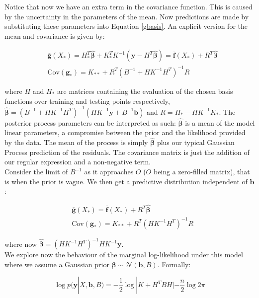 \documentclass[10pt,a4paper,twoside]{book}
\begin{document}
Notice that now we have an extra term in the covariance function. This is caused by the uncertainty in the parameters of the mean. Now predictions are made by substituting these parameters into Equation \ref{gbasis}. An explicit version for the mean and covariance is given by:

\begin{align}
&\overline{\boldsymbol{g}}(X_*) = H^T_* \hat{\boldsymbol{\beta}} + K_*^T K^{-1}(\boldsymbol{y} - H^T\hat{\boldsymbol{\beta}}) = \overline{\boldsymbol{f}}(X_*) + R^T\hat{\boldsymbol{\beta}}\\
&\mathrm{Cov}(\boldsymbol{g_*}) = K_{**} + R^T(B^{-1} + HK^{-1}H^T)^{-1}R
\end{align}

where $H$ and $H_*$ are matrices containing the evaluation of the chosen basis functions over training and testing points respectively, $\hat{\boldsymbol{\beta}} = (B^{-1} + H K^{-1} H^T)^{-1}(H K^{-1}\boldsymbol{y} + B^{-1}\boldsymbol{b})$ and $R = H_* - HK^{-1}K_{*}$. The posterior process parameters can be interpreted as such: $\hat{\boldsymbol{\beta}}$ is a mean of the model linear parameters, a compromise between the prior and the likelihood provided by the data. The mean of the process is simply $\hat{\boldsymbol{\beta}}$ plus our typical Gaussian Process prediction of the residuals. The covariance matrix is just the addition of our regular expression and a non-negative term.\\

Consider the limit of $B^{-1}$ as it approaches $O$ ($O$ being a zero-filled matrix), that is when the prior is vague. We then get a predictive distribution independent of $\boldsymbol{b}$:

\begin{align}
&\overline{\boldsymbol{g}}(X_*) = \overline{\boldsymbol{f}}(X_*) + R^T\hat{\boldsymbol{\beta}}\\
&\mathrm{Cov}(\boldsymbol{g_*}) = K_{**} + R^T\left(HK^{-1}H^T\right)^{-1}R
\end{align}

where now $\hat{\boldsymbol{\beta}} = \left(HK^{-1}H^T\right)^{-1}HK^{-1}\boldsymbol{y}$.\\

We explore now the behaviour of the marginal log-likelihood under this model where we assume a Gaussian prior $\boldsymbol{\beta} \sim \mathcal{N}(\boldsymbol{b}, B)$. Formally:

\begin{equation}
\log p(\boldsymbol{y}|X, \boldsymbol{b}, B) = -\dfrac{1}{2}\log |K + H^T B H| - \dfrac{n}{2}\log 2\pi
\end{equation}
\end{document}
